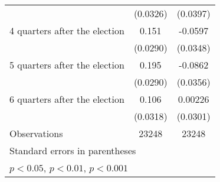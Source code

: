 \begin{table}[htbp]
\begin{tabular}{l*{2}{c}}
                    &    (0.0326)         &    (0.0397)         \\
[1em]
 4 quarters after the election&       0.151\sym{***}&     -0.0597         \\
                    &    (0.0290)         &    (0.0348)         \\
[1em]
 5 quarters after the election&       0.195\sym{***}&     -0.0862\sym{*}  \\
                    &    (0.0290)         &    (0.0356)         \\
[1em]
 6 quarters after the election&       0.106\sym{***}&     0.00226         \\
                    &    (0.0318)         &    (0.0301)         \\
\hline
Observations        &       23248         &       23248         \\
\hline\hline
\multicolumn{3}{l}{\footnotesize Standard errors in parentheses}\\
\multicolumn{3}{l}{\footnotesize \sym{*} \(p<0.05\), \sym{**} \(p<0.01\), \sym{***} \(p<0.001\)}\\
\end{tabular}
\end{table}
